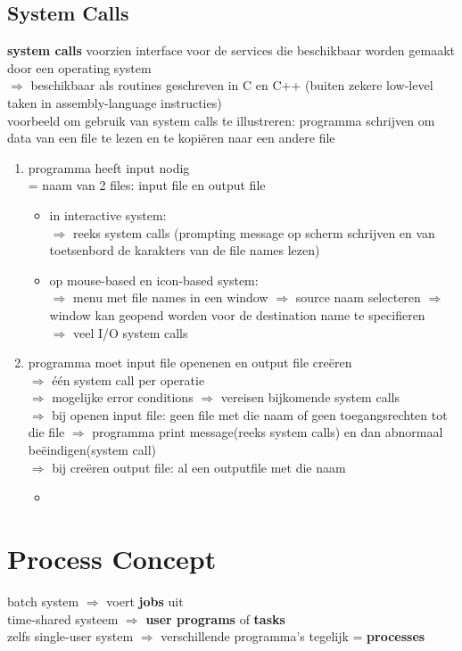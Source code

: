 \documentclass{report}
\begin{document}
\section{System Calls}
\textbf{system calls} voorzien interface voor de services die beschikbaar worden gemaakt door een operating system 
\\$\Rightarrow$ beschikbaar als routines geschreven in C en C++ (buiten zekere low-level taken in assembly-language instructies)
\\ voorbeeld om gebruik van system calls te illustreren: programma schrijven om data van een file te lezen en te kopi\"eren naar een andere file
\begin{enumerate}
\item programma heeft input nodig
\\= naam van 2 files: input file en output file
\begin{itemize}
\item in interactive system:
\\$\Rightarrow$ reeks system calls (prompting message op scherm schrijven en van toetsenbord de karakters van de file names lezen)
\item op mouse-based en icon-based system:
\\$\Rightarrow$ menu met file names in een window $\Rightarrow$ source naam selecteren $\Rightarrow$ window kan geopend worden voor de destination name te specifieren
\\$\Rightarrow$ veel I/O system calls
\end{itemize}
\item programma moet input file openenen en output file cre\"eren
\\$\Rightarrow$ \'e\'en system call per operatie
\\$\Rightarrow$ mogelijke error conditions $\Rightarrow$ vereisen bijkomende system calls
\\$\Rightarrow$ bij openen input file: geen file met die naam of geen toegangsrechten tot die file $\Rightarrow$ programma print message(reeks system calls) en dan abnormaal be\"eindigen(system call)
\\$\Rightarrow$ bij cre\"eren output file: al een outputfile met die naam
\begin {itemize}
\item 
\end {itemize}

\end{enumerate}


\chapter{Process Concept}
batch system $\Rightarrow$ voert \textbf{jobs} uit
\\time-shared systeem $\Rightarrow$ \textbf{user programs} of \textbf{tasks}
\\zelfs single-user system $\Rightarrow$ verschillende programma's tegelijk = \textbf{processes}
\end{document}
